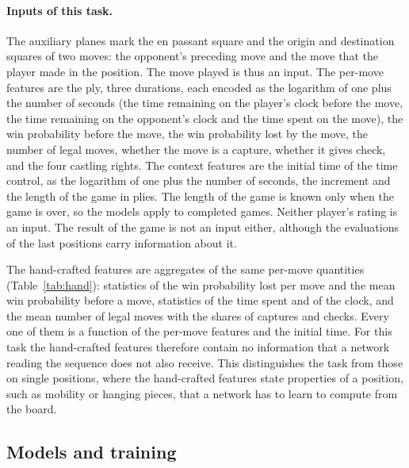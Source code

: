 \documentclass[11pt]{article}
\begin{document}
\paragraph{Inputs of this task.}
The auxiliary planes mark the en passant square and the origin and
destination squares of two moves: the opponent's preceding move and the move
that the player made in the position. The move played is thus an input. The
per-move features are the ply, three durations, each encoded as the logarithm
of one plus the number of seconds (the time remaining on the player's clock
before the move, the time remaining on the opponent's clock and the time
spent on the move),
the win probability before the move, the win probability lost by the move,
the number of legal moves, whether the move is a capture, whether it gives
check, and the four castling rights. The context features are the initial
time of the time control, as the logarithm of one plus the number of seconds,
the increment and the length of the game in plies. The length of the game is
known only when the game is over, so the models apply to completed games.
Neither player's rating is an input. The result of the game is not an input
either, although the evaluations of the last positions carry information
about it.

The  hand-crafted features are aggregates of the same
per-move quantities (Table~\ref{tab:hand}): statistics of the win probability
lost per move and the mean win probability before a move, statistics of the
time spent and of the clock, and the mean number of legal moves with the
shares of captures and checks. Every one of them is a function of the
per-move features and the initial time. For this task the hand-crafted
features therefore contain no information that a network reading the sequence
does not also receive. This distinguishes the task from those on single
positions, where the hand-crafted features state properties of a position,
such as mobility or hanging pieces, that a network has to learn to compute
from the board.

\subsection{Models and training}
\label{sec:models}


\end{document}
